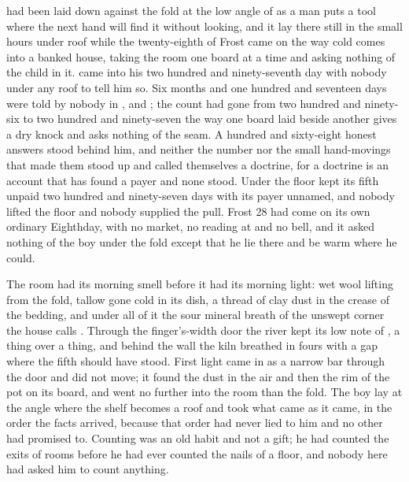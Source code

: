 
 had been laid down against the fold at the low angle of  as a man puts a tool where the next hand will find it without looking, and it lay there still in the small hours under  roof while the twenty-eighth of Frost came on the way cold comes into a banked house, taking the room one board at a time and asking nothing of the child in it.  came into his two hundred and ninety-seventh day with nobody under any roof to tell him so. Six months and one hundred and seventeen days were told by nobody in ,  and ; the count had gone from two hundred and ninety-six to two hundred and ninety-seven the way one board laid beside another gives a dry knock and asks nothing of the seam. A hundred and sixty-eight honest answers stood behind him, and neither the number nor the small hand-movings that made them stood up and called themselves a doctrine, for a doctrine is an account that has found a payer and none stood. Under the floor  kept its fifth unpaid two hundred and ninety-seven days with its payer unnamed, and nobody lifted the floor and nobody supplied the pull. Frost 28 had come on its own ordinary Eighthday, with no market, no reading at  and no bell, and it asked nothing of the boy under the fold except that he lie there and be warm where he could.

The room had its morning smell before it had its morning light: wet wool lifting from the fold, tallow gone cold in its dish, a thread of clay dust in the crease of the bedding, and under all of it the sour mineral breath of the unswept corner the house calls . Through the finger's-width door the river kept its low note of , a thing over a thing, and behind the wall the kiln breathed in fours with a gap where the fifth should have stood. First light came in as a narrow bar through the door and did not move; it found the dust in the air and then the rim of the pot on its board, and went no further into the room than the fold. The boy lay at the angle where the shelf becomes a roof and took what came as it came, in the order the facts arrived, because that order had never lied to him and no other had promised to. Counting was an old habit and not a gift; he had counted the exits of rooms before he had ever counted the nails of a floor, and nobody here had asked him to count anything.

